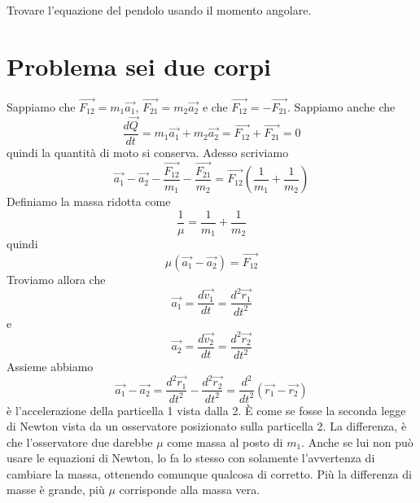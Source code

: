 \documentclass[a4paper]{article}
\begin{document}
%
%

\pagebreak

Trovare l'equazione del pendolo usando il momento angolare.

\section{Problema sei due corpi}

Sappiamo che \(\vec{F_{12}} = m_1\vec{a_1}\), \(\vec{F_{21}} = m_2\vec{a_2}\)
e che \(\vec{F_{12}} = -\vec{F_{21}}\).
Sappiamo anche che
\[
    \frac{d\vec{Q}}{dt} = m_1\vec{a_1} + m_2\vec{a_2} =\vec{F_{12}} + \vec{F_{21}} = 0
\]
quindi la quantità di moto si conserva.
Adesso scriviamo
\[
    \vec{a_1} - \vec{a_2} - \frac{\vec{F_{12}}}{m_1}
    - \frac{\vec{F_{21}}}{m_2} = \vec{F_{12}} \left(\frac{1}{m_1} + \frac{1}{m_2}\right)
\]
Definiamo la massa ridotta come
\[
    \frac{1}{\mu} = \frac{1}{m_1} + \frac{1}{m_2}
\]
quindi
\[
    \mu(\vec{a_1} - \vec{a_2}) = \vec{F_{12}}
\]
Troviamo allora che
\[
    \vec{a_1} = \frac{d\vec{v_1}}{dt} = \frac{d^2 \vec{r_1}}{dt^2}
\]
e
\[
    \vec{a_2} = \frac{d\vec{v_2}}{dt} = \frac{d^2 \vec{r_2}}{dt^2}
\]
Assieme abbiamo
\[
    \vec{a_1} - \vec{a_2} = \frac{d^2 \vec{r_1}}{dt^2} - \frac{d^2 \vec{r_2}}{dt^2}
    = \frac{d^2}{dt^2} \left(\vec{r_1} - \vec{r_2}\right)
\]
è l'accelerazione della particella 1 vista dalla 2.
È come se fosse la seconda legge di Newton vista da un osservatore posizionato sulla particella 2.
La differenza, è che l'osservatore due darebbe \(\mu\) come massa al posto di \(m_1\).
Anche se lui non può usare le equazioni di Newton, lo fa lo stesso con solamente l'avvertenza di cambiare
la massa, ottenendo comunque qualcosa di corretto.
Più la differenza di masse è grande, più \(\mu\) corrisponde alla massa vera.
\end{document}
